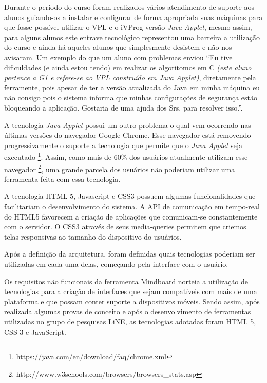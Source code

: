 Durante o período do curso foram realizados vários atendimento de suporte aos alunos guiando-os a instalar e configurar de forma apropriada suas máquinas para que fosse possível utilizar o VPL e o iVProg versão \emph{Java Applet}, mesmo assim, para alguns alunos este entrave tecnológico representou uma barreira a utilização do curso e ainda há aqueles alunos que simplesmente desistem e não nos avisaram. Um exemplo do que um aluno com problemas enviou ``Eu tive dificuldades (e ainda estou tendo) em realizar os algoritomos em C \emph{(este aluno pertence a G1 e refere-se ao VPL construído em Java Applet)}, diretamente pela ferramente, pois apesar de ter a versão atualizada do Java em minha máquina eu não consigo pois o sistema informa que minhas configurações de segurança estão bloqueando a aplicação. Gostaria de uma ajuda dos Srs. para resolver isso.''. 

A tecnologia \emph{Java Applet} possui um outro problema o qual vem ocorrendo nas últimas versões do navegador Google Chrome. Esse navegador está removendo progressivamente o suporte a tecnologia que permite que o \emph{Java Applet} seja executado \footnote{https://java.com/en/download/faq/chrome.xml}. Assim, como mais de 60\% dos usuários atualmente utilizam esse navegador \footnote{http://www.w3schools.com/browsers/browsers\_stats.asp}, uma grande parcela dos usuários não poderiam utilizar uma ferramenta feita com essa tecnologia.

A tecnologia HTML 5, Javascript e CSS3 possuem algumas funcionalidades que facilitariam o desenvolvimento do sistema. A API de comunicação em tempo-real do HTML5 favorecem a criação de aplicações que comunicam-se constantemente com o servidor. O CSS3 através de seus media-queries permitem que criemos telas responsivas ao tamanho do dispositivo do usuários.





Após a definição da arquitetura, foram definidas quais tecnologias poderiam ser utilizadas em cada uma delas, começando pela interface com o usuário. 


Os requisitos não funcionais da ferramenta Mindboard norteia a utilização de tecnologias para a criação de interfaces que sejam compatíveis com mais de uma plataforma e que possam conter suporte a dispositivos móveis. Sendo assim, após realizada algumas provas de conceito e após o desenvolvimento de ferramentas utilizadas no grupo de pesquisas LiNE, as tecnologias adotadas foram HTML 5, CSS 3 e JavaScript.

